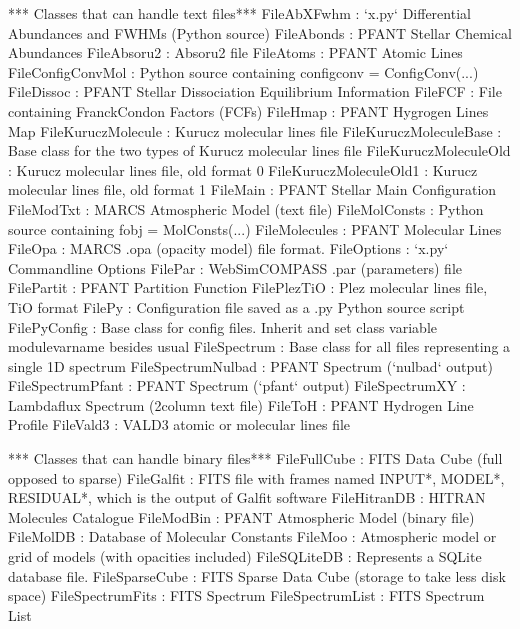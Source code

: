 \documentclass[letterpaper,10pt,english]{sphinxmanual}
\begin{document}
\begin{sphinxVerbatim}[commandchars=\\\{\}]
*** Classes that can handle text files***
FileAbXFwhm              : {}`x.py{}` Differential Abundances and FWHMs (Python source)
FileAbonds               : PFANT Stellar Chemical Abundances
FileAbsoru2              : \PYGZdq{}Absoru2\PYGZdq{} file
FileAtoms                : PFANT Atomic Lines
FileConfigConvMol        : Python source containing \PYGZsq{}config\PYGZus{}conv = ConfigConv(...)
FileDissoc               : PFANT Stellar Dissociation Equilibrium Information
FileFCF                  : File containing Franck\PYGZhy{}Condon Factors (FCFs)
FileHmap                 : PFANT Hygrogen Lines Map
FileKuruczMolecule       : Kurucz molecular lines file
FileKuruczMoleculeBase   : Base class for the two types of Kurucz molecular lines file
FileKuruczMoleculeOld    : Kurucz molecular lines file, old format \PYGZsh{}0
FileKuruczMoleculeOld1   : Kurucz molecular lines file, old format \PYGZsh{}1
FileMain                 : PFANT Stellar Main Configuration
FileModTxt               : MARCS Atmospheric Model (text file)
FileMolConsts            : Python source containing \PYGZsq{}fobj = MolConsts(...)
FileMolecules            : PFANT Molecular Lines
FileOpa                  : MARCS \PYGZdq{}.opa\PYGZdq{} (opacity model) file format.
FileOptions              : {}`x.py{}` Command\PYGZhy{}line Options
FilePar                  : WebSim\PYGZhy{}COMPASS \PYGZdq{}.par\PYGZdq{} (parameters) file
FilePartit               : PFANT Partition Function
FilePlezTiO              : Plez molecular lines file, TiO format
FilePy                   : Configuration file saved as a .py Python source script
FilePyConfig             : Base class for config files. Inherit and set class variable \PYGZsq{}modulevarname\PYGZsq{} besides usual
FileSpectrum             : Base class for all files representing a single 1D spectrum
FileSpectrumNulbad       : PFANT Spectrum ({}`nulbad{}` output)
FileSpectrumPfant        : PFANT Spectrum ({}`pfant{}` output)
FileSpectrumXY           : \PYGZdq{}Lambda\PYGZhy{}flux\PYGZdq{} Spectrum (2\PYGZhy{}column text file)
FileToH                  : PFANT Hydrogen Line Profile
FileVald3                : VALD3 atomic or molecular lines file

*** Classes that can handle binary files***
FileFullCube             : FITS Data Cube (\PYGZdq{}full\PYGZdq{} opposed to \PYGZdq{}sparse\PYGZdq{})
FileGalfit               : FITS file with frames named INPUT\PYGZus{}*, MODEL\PYGZus{}*, RESIDUAL\PYGZus{}*, which is the output of Galfit software
FileHitranDB             : HITRAN Molecules Catalogue
FileModBin               : PFANT Atmospheric Model (binary file)
FileMolDB                : Database of Molecular Constants
FileMoo                  : Atmospheric model or grid of models (with opacities included)
FileSQLiteDB             : Represents a SQLite database file.
FileSparseCube           : FITS Sparse Data Cube (storage to take less disk space)
FileSpectrumFits         : FITS Spectrum
FileSpectrumList         : FITS Spectrum List


\end{sphinxVerbatim}
\end{document}
